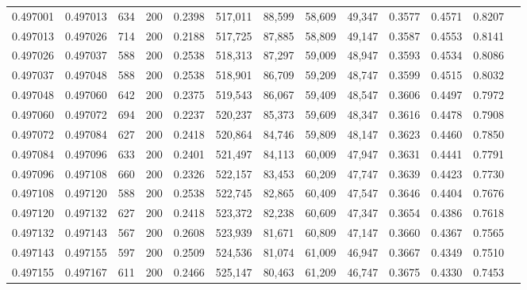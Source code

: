 \begin{tabular}{rrrrrrrrrrrrr}
0.497001 & 0.497013 &    634 & 200 &                                     0.2398 & 517,011 &  88,599 &  58,609 &  49,347 & 0.3577 & 0.4571 & 0.8207 \\
0.497013 & 0.497026 &    714 & 200 &                                     0.2188 & 517,725 &  87,885 &  58,809 &  49,147 & 0.3587 & 0.4553 & 0.8141 \\
0.497026 & 0.497037 &    588 & 200 &                                     0.2538 & 518,313 &  87,297 &  59,009 &  48,947 & 0.3593 & 0.4534 & 0.8086 \\
0.497037 & 0.497048 &    588 & 200 &                                     0.2538 & 518,901 &  86,709 &  59,209 &  48,747 & 0.3599 & 0.4515 & 0.8032 \\
0.497048 & 0.497060 &    642 & 200 &                                     0.2375 & 519,543 &  86,067 &  59,409 &  48,547 & 0.3606 & 0.4497 & 0.7972 \\
0.497060 & 0.497072 &    694 & 200 &                                     0.2237 & 520,237 &  85,373 &  59,609 &  48,347 & 0.3616 & 0.4478 & 0.7908 \\
0.497072 & 0.497084 &    627 & 200 &                                     0.2418 & 520,864 &  84,746 &  59,809 &  48,147 & 0.3623 & 0.4460 & 0.7850 \\
0.497084 & 0.497096 &    633 & 200 &                                     0.2401 & 521,497 &  84,113 &  60,009 &  47,947 & 0.3631 & 0.4441 & 0.7791 \\
0.497096 & 0.497108 &    660 & 200 &                                     0.2326 & 522,157 &  83,453 &  60,209 &  47,747 & 0.3639 & 0.4423 & 0.7730 \\
0.497108 & 0.497120 &    588 & 200 &                                     0.2538 & 522,745 &  82,865 &  60,409 &  47,547 & 0.3646 & 0.4404 & 0.7676 \\
0.497120 & 0.497132 &    627 & 200 &                                     0.2418 & 523,372 &  82,238 &  60,609 &  47,347 & 0.3654 & 0.4386 & 0.7618 \\
0.497132 & 0.497143 &    567 & 200 &                                     0.2608 & 523,939 &  81,671 &  60,809 &  47,147 & 0.3660 & 0.4367 & 0.7565 \\
0.497143 & 0.497155 &    597 & 200 &                                     0.2509 & 524,536 &  81,074 &  61,009 &  46,947 & 0.3667 & 0.4349 & 0.7510 \\
0.497155 & 0.497167 &    611 & 200 &                                     0.2466 & 525,147 &  80,463 &  61,209 &  46,747 & 0.3675 & 0.4330 & 0.7453 \\

\end{tabular}
